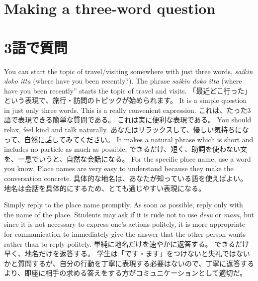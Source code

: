 \documentclass[uplatex,dvipdfmx,b5paper,english,10pt]{jsbook}
\begin{document}
\ifEnglish
\section{Making a three-word question}
\else
\section{3語で質問}
\fi


\ifEnglish
You can start the topic of travel/visiting somewhere with just three words, {\it saikin doko itta\/} (where have you been recently?).
The phrase {\it saikin doko itta\/} (where have you been recently'' starts the topic of travel and visits.
\else
「最近どこ行った」という表現で、旅行・訪問のトピックが始められます。
\fi
\ifEnglish
It is a simple question in just only three words.
This is a really convenient expression.
\else
これは、たった3語で表現できる簡単な質問である。
これは実に便利な表現である。
\fi
\ifEnglish
You should relax, feel kind and talk naturally.
\else
あなたはリラックスして、優しい気持ちになって、自然に話してみてください。
\fi
\ifEnglish
It makes a natural phrase which is short and includes no particle as much as possible,
\else
できるだけ、短く、助詞を使わない文を、一息でいうと、自然な会話になる。
\fi
\ifEnglish
For the specific place name, use a word you know.
Place names are very easy to understand because they make the conversation concrete.
\else
具体的な地名は、あなたが知っている語を使えばよい。
地名は会話を具体的にするため、とても通じやすい表現になる。
\fi

\ifEnglish
Simply reply to the place name promptly.
As soon as possible, reply only with the name of the place.
Students may ask if it is rude not to use {\it desu\/} or {\it masu\/}, but since it is not necessary to express one's actions politely, it is more appropriate for communication to immediately give the answer that the other person wants rather than to reply politely.
\else
単純に地名だけを速やかに返答する。
できるだけ早く、地名だけを返答する。
学生は「です・ます」をつけないと失礼ではないかと質問するが、自分の行動を丁寧に表現する必要はないので、丁寧に返答するより、即座に相手の求める答えをする方がコミュニケーションとして適切だ。
\fi

\end{document}
